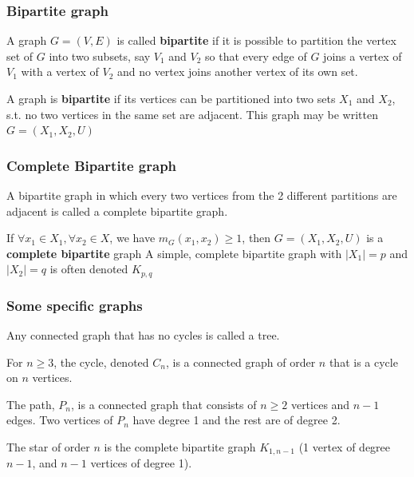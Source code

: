 \documentclass[aspectratio=169]{beamer}
\begin{document}
\begin{frame}\frametitle{Bipartite graph}
	\begin{definition}
		A graph $G=(V,E)$ is called {\bf bipartite} if it is possible to partition the vertex set of $G$ into two subsets, say $V_1$ and $V_2$ so that every edge of $G$ joins a vertex of $V_1$ with a vertex of $V_2$ and no vertex joins another vertex of its own set.
	\end{definition}
	\begin{definition}
		A graph is \textbf{bipartite} if its vertices can be partitioned into two sets $X_1$ and $X_2$, s.t. no two vertices in the same set are adjacent.
		This graph may be written $G=(X_1,X_2,U)$
	\end{definition}
\end{frame}


\begin{frame}\frametitle{Complete Bipartite graph}
	\begin{definition}
		A bipartite graph in which every two vertices from the 2 different partitions are adjacent is called a complete bipartite graph.
	\end{definition}
	\begin{definition}
		If $\forall x_1\in X_1, \forall x_2\in X$, we have $m_G(x_1,x_2)\geq 1$, then $G=(X_1,X_2,U)$ is a \textbf{complete bipartite} graph
		\vskip0.5cm
		A simple, complete bipartite graph with $|X_1|=p$ and $|X_2|=q$ is often denoted $K_{p,q}$
	\end{definition}
\end{frame}

\begin{frame}\frametitle{Some specific graphs}
	\begin{definition}[{Tree}]
		Any connected graph that has no cycles is called a tree.
	\end{definition}
	\begin{definition}[{Cycle $C_n$}]
		For $n\geq 3$, the cycle, denoted $C_n$, is a connected graph of order $n$ that is a cycle on $n$ vertices.
	\end{definition}
	\begin{definition}[{Path $P_n$}]
		The path, $P_n$, is a connected graph that consists of $n\geq 2$ vertices and $n-1$ edges. Two vertices of $P_n$ have degree 1 and the rest are of degree 2.
	\end{definition}
	\begin{definition}[{Star $S_n$}]
		The star of order $n$ is the complete bipartite graph $K_{1,n-1}$ (1 vertex of degree $n-1$, and $n-1$ vertices of degree 1). 
	\end{definition}
\end{frame}
\end{document}
